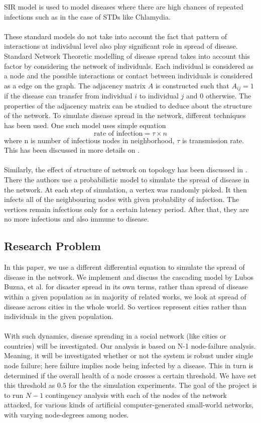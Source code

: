 \documentclass[11pt]{article}
\begin{document}
SIR model is used to model diseases where there are high chances of repeated infections such as in the case of STDs like Chlamydia.\\
\\
These standard models do not take into account the fact that pattern of interactions at individual level also play significant role in spread of disease. Standard Network Theoretic modelling of disease spread takes into account this factor by considering the network of individuals. Each individual is considered as a node and the possible interactions or contact between individuals is considered as a edge on the graph. The adjacency matrix $A$ is constructed such that $A_{ij} = 1$ if the disease can transfer from individual $i$ to individual $j$ and $0$ otherwise. The properties of the adjacency matrix can be studied to deduce about the structure of the network. To simulate disease spread in the network, different techniques has been used. One such model uses simple equation
\[ \text {rate of infection} = \tau \times n \] where n is number of infectious nodes in neighborhood, $\tau$ is transmission rate. This has been discussed in more details on \cite{keeling}.\\
\\
Similarly, the effect of structure of network on topology has been discussed in \cite{shirley}. There the authors use a probabilistic model to simulate the spread of disease in the network. At each step of simulation, a vertex was randomly picked. It then infects all of the neighbouring nodes with given probability of infection. The vertices remain infectious only for a certain latency period. After that, they are no more infectious and also immune to disease.

\subsection{Research Problem}
In this paper, we use a different differential equation to simulate the spread of disease in the network. We implement and discuss the cascading model by Lubos Buzna, et al. \cite{helbing} for disaster spread in its own terms, rather than spread of disease within a given population as in majority of related works, we look at spread of disease across cities in the whole world. So vertices represent cities rather than individuals in the given population.\\
\\
With such dynamics, disease spreading in a social network (like cities or countries) will be investigated.  Our analysis is based on N-1 node-failure analysis. Meaning, it will be investigated whether or not the system is robust under single node failure; here failure implies node being infected by a disease. This in turn is determined if the overall health of a node crosses a certain threshold. We have set this threshold as $0.5$ for the the simulation experiments. The goal of the project is to run $N-1$ contingency analysis with each of the nodes of the network attacked, for various kinds of artificial computer-generated small-world networks, with varying node-degrees among nodes.
\\
\end{document}
